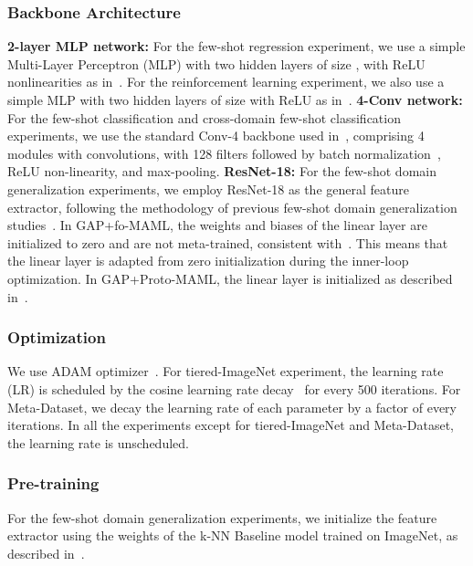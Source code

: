 \subsubsection{Backbone Architecture}
\label{sec:5.1.2}
\textbf{2-layer MLP network:}
For the few-shot regression experiment, we use a simple Multi-Layer Perceptron (MLP) with two hidden layers of size , with ReLU  nonlinearities as in~\cite{finn2017model}. For the reinforcement learning experiment, we also use a simple MLP with two hidden layers of size  with ReLU as in~\cite{finn2017model}.
\newline
\textbf{4-Conv network:}
For the few-shot classification and cross-domain few-shot classification experiments, we use the standard Conv-4 backbone used in~\cite{vinyals2016matching}, comprising 4 modules with  convolutions, with 128 filters followed by batch normalization~\cite{ioffe2015batch}, ReLU non-linearity, and  max-pooling.
\newline
\textbf{ResNet-18:}
For the few-shot domain generalization experiments, we employ ResNet-18 as the general feature extractor, following the methodology of previous few-shot domain generalization studies~\cite{triantafillou2019meta, baik2023learning}. 
In GAP+fo-MAML, the weights and biases of the linear layer are initialized to zero and are not meta-trained, consistent with~\cite{triantafillou2019meta}. This means that the linear layer is adapted from zero initialization during the inner-loop optimization. 
In GAP+Proto-MAML, the linear layer is initialized as described in~\cite{triantafillou2019meta}.

\subsubsection{Optimization}
We use ADAM optimizer~\cite{kingma2014adam}. 
For tiered-ImageNet experiment, the learning rate (LR) is scheduled by the cosine learning rate decay~\cite{loshchilov2016sgdr} for every 500 iterations. 
For Meta-Dataset, we decay the learning rate of each parameter by a factor of  every  iterations. In all the experiments except for tiered-ImageNet and Meta-Dataset, the learning rate is unscheduled.

\subsubsection{Pre-training}
For the few-shot domain generalization experiments, we initialize the feature extractor using the weights of the k-NN Baseline model trained on ImageNet, as described in~\cite{triantafillou2019meta}.

